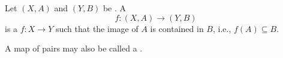\begin{definition} \label{definition:map_of_pairs_of_topological_spaces}
Let $(X, A)$ and $(Y, B)$ be . A  
$$f: (X, A) \to (Y, B)$$ 
 is a  $f: X \to Y$ such that the image of $A$ is contained in $B$, i.e., $f(A) \subseteq B$.

 A map of pairs may also be called a .
\end{definition}